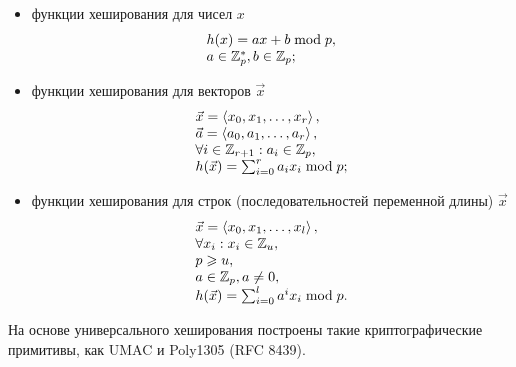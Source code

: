 \begin{itemize}
    \item функции хеширования для чисел $x$
    \[ \begin{array}{l}
    h(x) = ax + b \bmod p,\\
    a \in \mathbb{Z}^*_p, b \in \mathbb{Z}_p;\\
    \end{array} \]
    \item функции хеширования для векторов $\vec{x}$
    \[ \begin{array}{l}
    \vec{x} = \left \langle x_0, x_1, \dots, x_r \right \rangle,\\
    \vec{a} = \left \langle a_0, a_1, \dots, a_r \right \rangle,\\
    \forall i \in \mathbb{Z}_{r+1}: a_i \in \mathbb{Z}_{p},\\
    h( \vec{x} ) = \sum_{i=0}^{r} a_i x_i \bmod p;\\
    \end{array} \]
    \item функции хеширования для строк (последовательностей переменной длины) $\vec{x}$
    \[ \begin{array}{l}
    \vec{x} = \left \langle x_0, x_1, \dots, x_l \right \rangle,\\
    \forall x_i: x_i \in \mathbb{Z}_{u}, \\
    p \geqslant u, \\
    a \in \mathbb{Z}_{p}, a \neq 0,\\
    h( \vec{x} ) = \sum_{i=0}^{l} a^{i} x_i \bmod p.\\
    \end{array} \]
\end{itemize}

На основе универсального хеширования построены такие криптографические примитивы, как UMAC и Poly1305 (RFC 8439).
